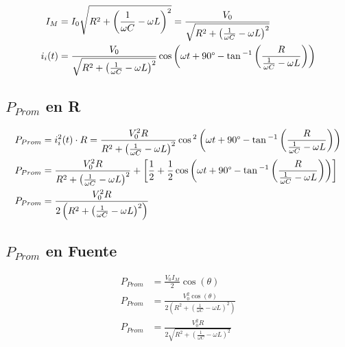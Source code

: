 \begin{align*}
  I_M &= I_0 \sqrt{R^2 + \left(\frac{1}{\omega C} - \omega L\right)^2} = \frac{V_0}{\sqrt{R^2 + \left(\frac{1}{\omega C} - \omega L\right)^2}}\\
  i_i(t) &= \frac{V_0}{\sqrt{R^2 + \left(\frac{1}{\omega C} - \omega L\right)^2}} \cos\left(\omega t + 90\degree - \tan{^{-1}}\left(\frac{R}{\frac{1}{\omega C} - \omega L}\right)\right)
\end{align*}

\subsection*{$P_{Prom}$  en R}

\begin{align*}
  P_{Prom} &= i_i^2(t) \cdot R = \frac{V_0^2 R}{R^2 + \left(\frac{1}{\omega C} - \omega L\right)^2} \cos{^2}\left(\omega t + 90\degree - \tan{^{-1}}\left(\frac{R}{\frac{1}{\omega C} - \omega L}\right)\right) \\
  P_{Prom} &= \frac{V_0^2 R}{R^2 + \left(\frac{1}{\omega C} - \omega L\right)^2} + \left[\frac{1}{2} + \frac{1}{2}\cos\left(\omega t + 90\degree - \tan{^{-1}}\left(\frac{R}{\frac{1}{\omega C} - \omega L}\right)\right)\right] \\
  P_{Prom} &= \frac{V_0^2 R}{2\left( R^2 + \left(\frac{1}{\omega C} - \omega L\right)^2\right)}
\end{align*}

\subsection*{$P_{Prom}$ en Fuente}

\begin{align*}
  P_{Prom} &= \frac{V_0 I_M}{2} \cos(\theta)\\
  P_{Prom} &= \frac{V_0^2 \cos(\theta)}{2\left( R^2 + \left(\frac{1}{\omega C} - \omega L\right)^2\right)}\\
  P_{Prom} &= \frac{V_0^2 R}{2\sqrt{R^2 + \left(\frac{1}{\omega C} - \omega L\right)^2}}
\end{align*}


